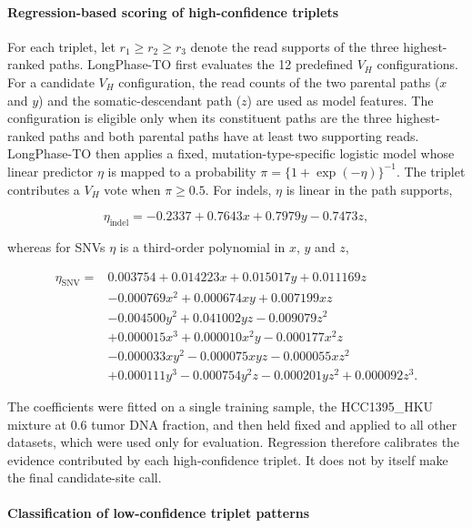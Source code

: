 \documentclass[pdflatex,sn-nature]{sn-jnl}
\begin{document}
\paragraph{Regression-based scoring of high-confidence triplets}\label{rationale-for-pattern-based-evidence-selection}

For each triplet, let \(r_1\geq r_2\geq r_3\) denote the read supports of the three highest-ranked paths. LongPhase-TO first evaluates the 12 predefined \(V_H\) configurations. For a candidate \(V_H\) configuration, the read counts of the two parental paths (\(x\) and \(y\)) and the somatic-descendant path (\(z\)) are used as model features. The configuration is eligible only when its constituent paths are the three highest-ranked paths and both parental paths have at least two supporting reads. LongPhase-TO then applies a fixed, mutation-type-specific logistic model whose linear predictor \(\eta\) is mapped to a probability \(\pi=\{1+\exp(-\eta)\}^{-1}\). The triplet contributes a \(V_H\) vote when \(\pi\geq0.5\). For indels, \(\eta\) is linear in the path supports,

\[
\eta_{\mathrm{indel}}=-0.2337+0.7643x+0.7979y-0.7473z,
\]

whereas for SNVs \(\eta\) is a third-order polynomial in \(x\), \(y\) and \(z\),

\[
\begin{aligned}
\eta_{\mathrm{SNV}}={}&0.003754+0.014223x+0.015017y+0.011169z\\
&-0.000769x^2+0.000674xy+0.007199xz\\
&-0.004500y^2+0.041002yz-0.009079z^2\\
&+0.000015x^3+0.000010x^2y-0.000177x^2z\\
&-0.000033xy^2-0.000075xyz-0.000055xz^2\\
&+0.000111y^3-0.000754y^2z-0.000201yz^2+0.000092z^3.
\end{aligned}
\]

The coefficients were fitted on a single training sample, the HCC1395\_HKU mixture at 0.6 tumor DNA fraction, and then held fixed and applied to all other datasets, which were used only for evaluation. Regression therefore calibrates the evidence contributed by each high-confidence triplet. It does not by itself make the final candidate-site call.

\paragraph{Classification of low-confidence triplet patterns}\label{low-confidence-variant-detection-using-vlow-ratio}
\end{document}
